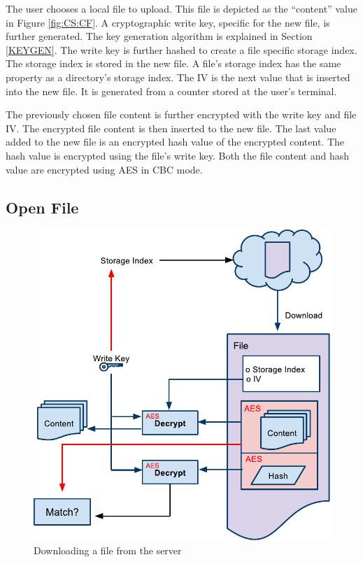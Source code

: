 \documentclass[pdftex,english,10pt,b5paper,twoside]{book}
\begin{document}
The user chooses a local file to upload. This file is depicted as the
``content'' value in Figure \ref{fig:CS:CF}. A cryptographic write key, specific
for the new file, is further generated. The key generation algorithm is
explained in Section \ref{KEYGEN}. The write key is further hashed to create a
file specific storage index. The storage index is stored in the new file. A
file's storage index has the same property as a directory's storage index. The
\ac{IV} is the next value that is inserted into the new file. It is
generated from a counter stored at the user's terminal.

The previously chosen file content is further encrypted with the write key and
file IV. The encrypted file content is then inserted to the new file. The last
value added to the new file is an encrypted hash value of the encrypted content.
The hash value is encrypted using the file's write key. Both the file content
and hash value are encrypted using AES in CBC mode.

\subsection{Open File} 
\begin{figure}[h!]
    \centering
    \includegraphics[width=\columnwidth]{CryptoOpenFile.pdf}
    \caption{Downloading a file from the server}
    \label{fig:CS:OF}
\end{figure}
\end{document}
